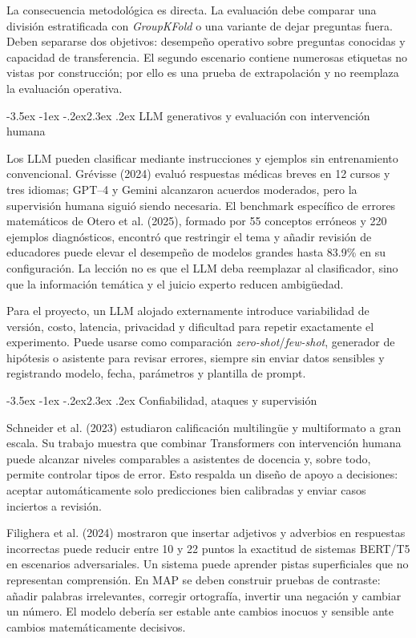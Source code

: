 \documentclass[11pt,oneside,openany]{book}
\makeatletter
\renewcommand\section{\@startsection{section}{1}{\z@}%
  {-3.5ex \@plus -1ex \@minus -.2ex}{2.3ex \@plus .2ex}%
  {\normalfont\Large\sffamily\bfseries\color{AzulMedio}}}
\makeatother
\begin{document}
La consecuencia metodológica es directa. La evaluación debe comparar una división
estratificada con \emph{GroupKFold} o una variante de dejar preguntas fuera. Deben
separarse dos objetivos: desempeño operativo sobre preguntas conocidas y capacidad
de transferencia. El segundo escenario contiene numerosas etiquetas no vistas por
construcción; por ello es una prueba de extrapolación y no reemplaza la evaluación
operativa.

\section{LLM generativos y evaluación con intervención humana}

Los LLM pueden clasificar mediante instrucciones y ejemplos sin entrenamiento
convencional. Grévisse (2024) evaluó respuestas médicas breves en 12 cursos y tres
idiomas; GPT--4 y Gemini alcanzaron acuerdos moderados, pero la supervisión humana
siguió siendo necesaria. El benchmark específico de errores matemáticos de Otero
et al. (2025), formado por 55 conceptos erróneos y 220 ejemplos diagnósticos,
encontró que restringir el tema y añadir revisión de educadores puede elevar el
desempeño de modelos grandes hasta 83.9\% en su configuración. La lección no es que
el LLM deba reemplazar al clasificador, sino que la información temática y el
juicio experto reducen ambigüedad.

Para el proyecto, un LLM alojado externamente introduce variabilidad de versión,
costo, latencia, privacidad y dificultad para repetir exactamente el experimento.
Puede usarse como comparación \emph{zero-shot}/\emph{few-shot}, generador de
hipótesis o asistente para revisar errores, siempre sin enviar datos sensibles y
registrando modelo, fecha, parámetros y plantilla de prompt.

\section{Confiabilidad, ataques y supervisión}

Schneider et al. (2023) estudiaron calificación multilingüe y multiformato a gran
escala. Su trabajo muestra que combinar Transformers con intervención humana puede
alcanzar niveles comparables a asistentes de docencia y, sobre todo, permite
controlar tipos de error. Esto respalda un diseño de apoyo a decisiones: aceptar
automáticamente solo predicciones bien calibradas y enviar casos inciertos a
revisión.

Filighera et al. (2024) mostraron que insertar adjetivos y adverbios en respuestas
incorrectas puede reducir entre 10 y 22 puntos la exactitud de sistemas BERT/T5 en
escenarios adversariales. Un sistema puede aprender pistas superficiales que no
representan comprensión. En MAP se deben construir pruebas de contraste: añadir
palabras irrelevantes, corregir ortografía, invertir una negación y cambiar un
número. El modelo debería ser estable ante cambios inocuos y sensible ante cambios
matemáticamente decisivos.
\end{document}
